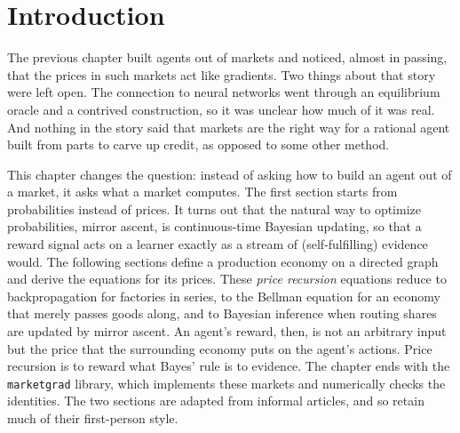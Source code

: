 \section{Introduction}\label{agency:sec:intro}

\begin{draftblock}
The previous chapter built agents out of markets and noticed, almost in passing, that the prices in such markets act like gradients. Two things about that story were left open. The connection to neural networks went through an equilibrium oracle and a contrived construction, so it was unclear how much of it was real. And nothing in the story said that markets are the right way for a rational agent built from parts to carve up credit, as opposed to some other method.

This chapter changes the question: instead of asking how to build an agent out of a market, it asks what a market computes. The first section starts from probabilities instead of prices. It turns out that the natural way to optimize probabilities, mirror ascent, is continuous-time Bayesian updating, so that a reward signal acts on a learner exactly as a stream of (self-fulfilling) evidence would. The following sections define a production economy on a directed graph and derive the equations for its prices. These \emph{price recursion} equations reduce to backpropagation for factories in series, to the Bellman equation for an economy that merely passes goods along, and to Bayesian inference when routing shares are updated by mirror ascent. An agent's reward, then, is not an arbitrary input but the price that the surrounding economy puts on the agent's actions. Price recursion is to reward what Bayes' rule is to evidence. The chapter ends with the \texttt{marketgrad} library, which implements these markets and numerically checks the identities. The two sections are adapted from informal articles, and so retain much of their first-person style.
\end{draftblock}


